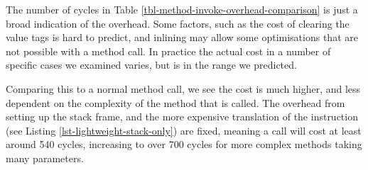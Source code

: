 The number of cycles in Table \ref{tbl-method-invoke-overhead-comparison} is just a broad indication of the overhead. Some factors, such as the cost of clearing the value tags is hard to predict, and inlining may allow some optimisations that are not possible with a method call. In practice the actual cost in a number of specific cases we examined varies, but is in the range we predicted.

Comparing this to a normal method call, we see the cost is much higher, and less dependent on the complexity of the method that is called. The overhead from setting up the stack frame, and the more expensive translation of the  instruction (see Listing \ref{lst-lightweight-stack-only}) are fixed, meaning a call will cost at least around 540 cycles, increasing to over 700 cycles for more complex methods taking many parameters.

